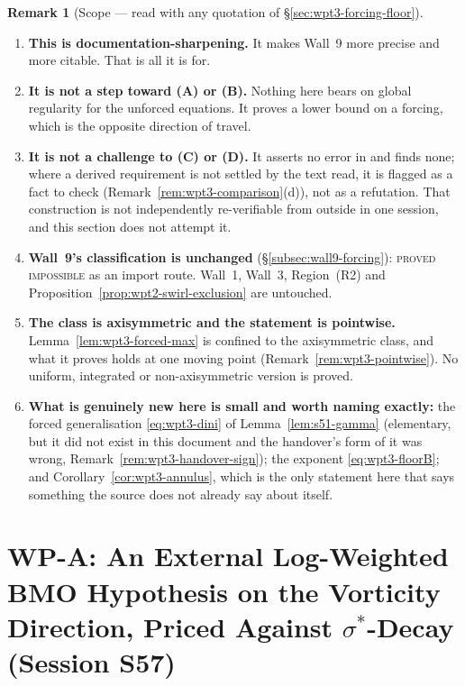 \documentclass[11pt]{article}
\theoremstyle{definition}
\newtheorem{remark}[theorem]{Remark}
\theoremstyle{remark}
\begin{document}
\begin{remark}[Scope --- read with any quotation of
  \S\ref{sec:wpt3-forcing-floor}]\label{rem:wpt3-scope}
  \begin{enumerate}[label=(\arabic*),leftmargin=2.4em]
    \item \textbf{This is documentation-sharpening.} It makes Wall~9 more
      precise and more citable. That is all it is for.
    \item \textbf{It is not a step toward (A) or (B).} Nothing here bears on
      global regularity for the unforced equations. It proves a lower bound
      on a forcing, which is the opposite direction of travel.
    \item \textbf{It is not a challenge to (C) or (D).} It asserts no error
      in \cite{OpenAI2026} and finds none; where a derived requirement is not
      settled by the text read, it is flagged as a fact to check
      (Remark~\ref{rem:wpt3-comparison}(d)), not as a refutation. That
      construction is not independently re-verifiable from outside in one
      session, and this section does not attempt it.
    \item \textbf{Wall~9's classification is unchanged}
      (\S\ref{subsec:wall9-forcing}): \textsc{proved impossible} as an import
      route. Wall~1, Wall~3, Region~(R2) and
      Proposition~\ref{prop:wpt2-swirl-exclusion} are untouched.
    \item \textbf{The class is axisymmetric and the statement is pointwise.}
      Lemma~\ref{lem:wpt3-forced-max} is confined to the axisymmetric class,
      and what it proves holds at one moving point
      (Remark~\ref{rem:wpt3-pointwise}). No uniform, integrated or
      non-axisymmetric version is proved.
    \item \textbf{What is genuinely new here is small and worth naming
      exactly:} the forced generalisation \eqref{eq:wpt3-dini} of
      Lemma~\ref{lem:s51-gamma} (elementary, but it did not exist in this
      document and the handover's form of it was wrong,
      Remark~\ref{rem:wpt3-handover-sign}); the exponent
      \eqref{eq:wpt3-floorB}; and Corollary~\ref{cor:wpt3-annulus}, which is
      the only statement here that says something the source does not
      already say about itself.
  \end{enumerate}
\end{remark}

\section{WP-A: An External Log-Weighted BMO Hypothesis on the Vorticity
Direction, Priced Against \texorpdfstring{$\sigma^*$}{sigma*}-Decay
(Session S57)}
\label{sec:wpa-s57}
\end{document}

